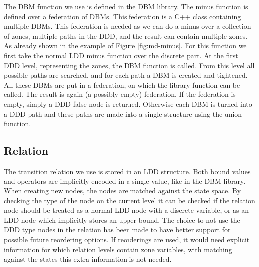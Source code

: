 The DBM function we use is defined in the \uppaal{} DBM library. The minus function is defined over a federation of DBMs. This federation is a C++ class containing multiple DBMs. This federation is needed as we can do a minus over a collection of zones, multiple paths in the DDD, and the result can contain multiple zones. As already shown in the example of Figure \ref{fig:md-minus}. For this function we first take the normal LDD minus function over the discrete part. At the first DDD level, representing the zones, the DBM function is called. From this level all possible paths are searched, and for each path a DBM is created and tightened. All these DBMs are put in a federation, on which the library function can be called. The result is again (a possibly empty) federation. If the federation is empty, simply a DDD-false node is returned. Otherwise each DBM is turned into a DDD path and these paths are made into a single structure using the union function.

\subsection{Relation}
The transition relation we use is stored in an LDD structure. Both bound values and operators are implicitly encoded in a single value, like in the DBM library. When creating new nodes, the nodes are matched against the state space. By checking the type of the node on the current level it can be checked if the relation node should be treated as a normal LDD node with a discrete variable, or as an LDD node which implicitly stores an upper-bound. The choice to not use the DDD type nodes in the relation has been made to have better support for possible future reordering options. If reorderings are used, it would need explicit information for which relation levels contain zone variables, with matching against the states this extra information is not needed.

